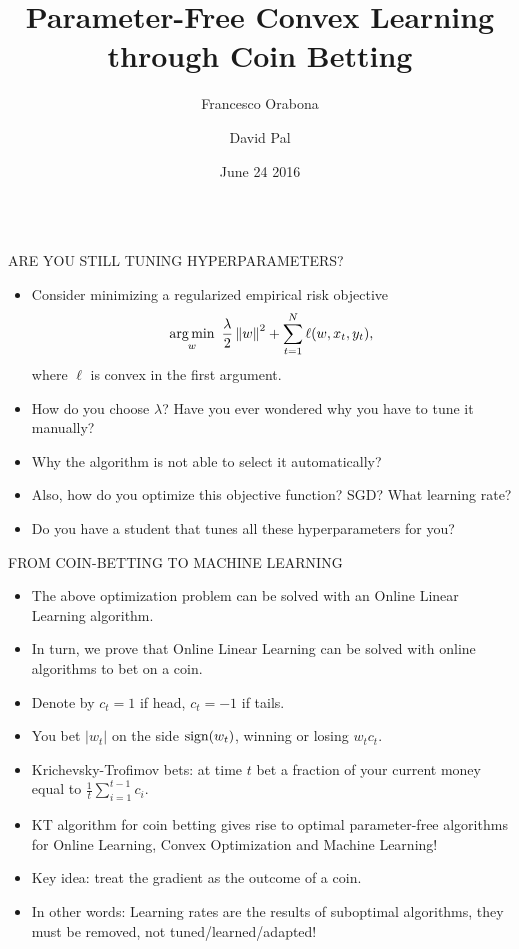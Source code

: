 \documentclass[final,t,serif,mathserif]{beamer}
\title{\huge Parameter-Free Convex Learning through Coin Betting}
\author{Francesco Orabona \and David Pal}
\institute[] %
{
  Yahoo Research, New York
}
\date[June 24 2016]{June 24 2016}
\def\spazio{\vspace{-0.325cm}}
\begin{document}
\begin{frame}{} 

\begin{columns}[t]
  \begin{column}{.33\linewidth}

    \begin{block}{ARE YOU STILL TUNING HYPERPARAMETERS?}
      \spazio
      \centering
      \begin{itemize}
      \item Consider minimizing a regularized empirical risk objective
      \begin{equation}
      \label{equation:objective-function}
         \operatorname*{arg\,min}_{w} \ \frac{\lambda}{2} \left\|{w}\right\|^2 + \sum_{t=1}^N \ell(w, x_t, y_t),
      \end{equation}
      where $\ell$ is convex in the first argument.
      \item How do you choose $\lambda$? Have you ever wondered why you have to tune it manually?
      \item Why the algorithm is not able to select it automatically?
      \item Also, how do you optimize this objective function? SGD? What learning rate?
      \item Do you have a student that tunes all these hyperparameters for you?
      \end{itemize}
      \spazio
    \end{block}
    

    \begin{block}{FROM COIN-BETTING TO MACHINE LEARNING}
    \spazio
    \begin{itemize}
      \item The above optimization problem can be solved with an Online Linear Learning algorithm.
      \item In turn, we prove that Online Linear Learning can be solved with online algorithms to bet on a coin.
    \end{itemize}
    
    \vspace{1cm}
    
    \begin{itemize}
      \item Denote by $c_t=1$ if head, $c_t=-1$ if tails.
      \item You bet $|w_t|$ on the side ${\rm sign}(w_t)$, winning or losing $ w_t c_t$.
      \item Krichevsky-Trofimov bets: at time $t$ bet a fraction of your current money equal to $\tfrac{1}{t} \sum_{i=1}^{t-1} c_i$.
      \item \alert{KT algorithm for coin betting gives rise to optimal parameter-free algorithms for Online Learning, Convex Optimization and Machine Learning!}
      \item Key idea: treat the gradient as the outcome of a coin.
      \item In other words: \alert{Learning rates are the results of suboptimal algorithms, they must be removed, not tuned/learned/adapted!}
    \end{itemize}
    \spazio
    \end{block}
    

\end{column}
\end{columns}
\end{frame}
\end{document}
